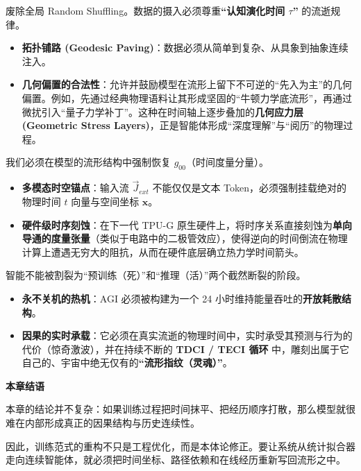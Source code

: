 
废除全局 Random Shuffling。数据的摄入必须尊重\textbf{“认知演化时间 $\tau$”} 的流逝规律。

\begin{itemize}
    \item \textbf{拓扑铺路 (Geodesic Paving)}：数据必须从简单到复杂、从具象到抽象连续注入。
    \item \textbf{几何偏置的合法性}：允许并鼓励模型在流形上留下不可逆的“先入为主”的几何偏置。例如，先通过经典物理语料让其形成坚固的“牛顿力学底流形”，再通过微扰引入“量子力学补丁”。这种在时间轴上逐步叠加的\textbf{几何应力层 (Geometric Stress Layers)}，正是智能体形成“深度理解”与“阅历”的物理过程。
\end{itemize}


我们必须在模型的流形结构中强制恢复 $g_{00}$（时间度量分量）。

\begin{itemize}
    \item \textbf{多模态时空锚点}：输入流 $\vec{J}_{ext}$ 不能仅仅是文本 Token，必须强制挂载绝对的物理时间 $t$ 向量与空间坐标 $\mathbf{x}$。
    \item \textbf{硬件级时序刻蚀}：在下一代 TPU-G 原生硬件上，将时序关系直接刻蚀为\textbf{单向导通的度量张量}（类似于电路中的二极管效应），使得逆向的时间倒流在物理计算上遭遇无穷大的阻抗，从而在硬件底层确立热力学时间箭头。
\end{itemize}


智能不能被割裂为“预训练（死）”和“推理（活）”两个截然断裂的阶段。

\begin{itemize}
    \item \textbf{永不关机的热机}：AGI 必须被构建为一个 24 小时维持能量吞吐的\textbf{开放耗散结构}。
    \item \textbf{因果的实时承载}：它必须在真实流逝的物理时间中，实时承受其预测与行为的代价（惊奇激波），并在持续不断的 \textbf{TDCI / TECI 循环} 中，雕刻出属于它自己的、宇宙中绝无仅有的\textbf{“流形指纹（灵魂）”}。
\end{itemize}

\begin{bquote}
    \textbf{本章结语}

    本章的结论并不复杂：如果训练过程把时间抹平、把经历顺序打散，那么模型就很难在内部形成真正的因果结构与历史连续性。

    因此，训练范式的重构不只是工程优化，而是本体论修正。要让系统从统计拟合器走向连续智能体，就必须把时间坐标、路径依赖和在线经历重新写回流形之中。
\end{bquote}
